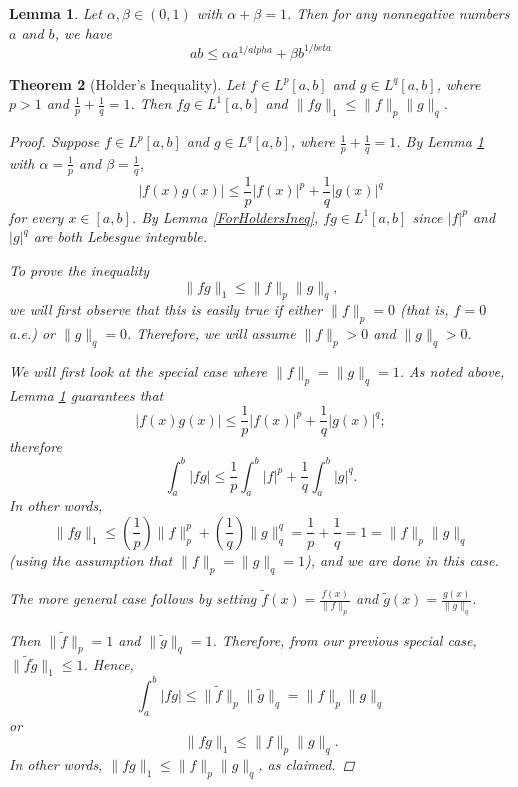 \documentclass[12pt]{amsart}
\theoremstyle{plain}
\newtheorem{thm}{Theorem}[section]
\newtheorem{lemma}[thm]{Lemma}
\theoremstyle{definition}
\theoremstyle{remark}
\numberwithin{equation}{section}
\numberwithin{thm}{section}
\begin{document}
\begin{lemma} \label{lemma:AlphaBeta}
    Let $\alpha,\beta \in (0,1)$ with $\alpha + \beta =1$. Then for any nonnegative numbers $a$ and $b$, we have
    \begin{equation*}
        ab \leq \alpha a^{1/alpha} + \beta b^{1/beta}
    \end{equation*}
\end{lemma}
\begin{thm}[Holder’s Inequality]
Let $f \in L^p[a,b]$ and $g \in L^q[a,b]$, where $p >1$ and $\frac{1}{p} + \frac{1}{q} = 1$. Then $fg \in L^1[a,b]$ and $\| fg \|_1 \leq \|f\|_p\|g\|_q$.
\begin{proof}
Suppose $f \in L^p[a, b]$ and $g \in L^q[a, b]$, where $\frac{1}{p} + \frac{1}{q} = 1$. By Lemma \ref{lemma:AlphaBeta} with $\alpha = \frac{1}{p}$ and $\beta = \frac{1}{q}$, 
\[
|f(x) g(x)| \leq \frac{1}{p} |f(x)|^p + \frac{1}{q} |g(x)|^q
\]
for every $x \in [a, b]$. By Lemma \ref{ForHoldersIneq}, $fg \in L^1[a, b]$ since $|f|^p$ and $|g|^q$ are both Lebesgue integrable.

To prove the inequality
\[
\|fg\|_1 \leq \|f\|_p \|g\|_q,
\]
we will first observe that this is easily true if either $\|f\|_p = 0$ (that is, $f = 0$ a.e.) or $\|g\|_q = 0$. Therefore, we will assume $\|f\|_p > 0$ and $\|g\|_q > 0$.

We will first look at the special case where $\|f\|_p = \|g\|_q = 1$. As noted above, Lemma \ref{lemma:AlphaBeta} guarantees that
\[
|f(x) g(x)| \leq \frac{1}{p} |f(x)|^p + \frac{1}{q} |g(x)|^q;
\]
therefore
\[
\int_a^b |fg| \leq \frac{1}{p} \int_a^b |f|^p + \frac{1}{q} \int_a^b |g|^q.
\]
In other words,
\[
\|fg\|_1 \leq \left(\frac{1}{p}\right) \|f\|_p^p + \left(\frac{1}{q}\right) \|g\|_q^q = \frac{1}{p} + \frac{1}{q} = 1 = \|f\|_p \|g\|_q
\]
(using the assumption that $\|f\|_p = \|g\|_q = 1$), and we are done in this case.

The more general case follows by setting
$\tilde{f}(x) = \frac{f(x)}{\|f\|_p}$ and $\tilde{g}(x) = \frac{g(x)}{\|g\|_q}$.

Then $\|\tilde{f}\|_p = 1$ and $\|\tilde{g}\|_q = 1$. Therefore, from our previous special case, $\|\tilde{f}\tilde{g}\|_1 \leq 1$. Hence,
\[
\int_a^b |fg| \leq \|\tilde{f}\|_p\|\tilde{g}\|_q = \|f\|_p\|g\|_q
\]
or
\[
\|fg\|_1 \leq \|f\|_p\|g\|_q.
\]
In other words, $\|fg\|_1 \leq \|f\|_p\|g\|_q$, as claimed.
\end{proof}
\end{thm}
\end{document}
